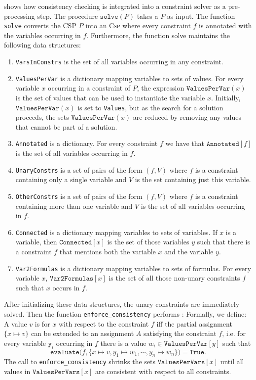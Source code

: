   shows how consistency checking is
integrated into a constraint solver as a pre-processing step.
The procedure $\texttt{solve}(P)$ takes a 
$P$ as input.  The function \texttt{solve} converts the CSP $P$ into an  \textsc{Csp} where every
constraint $f$ is annotated with the variables occurring in $f$.  Furthermore, the function solve maintains the
following data structures: 
\begin{enumerate}
\item \texttt{VarsInConstrs} is the set of all variables occurring in any constraint.
\item \texttt{ValuesPerVar} is a dictionary mapping variables to sets of values.  For every variable $x$
      occurring in a constraint of $P$, the expression $\texttt{ValuesPerVar}(x)$ is the set of values that can
      be used to instantiate the variable $x$.  Initially, $\texttt{ValuesPerVar}(x)$ is set to
      \texttt{Values}, but as the search for a solution proceeds, the sets $\texttt{ValuesPerVar}(x)$ are
      reduced by removing any values that  cannot be part of a solution. 
\item \texttt{Annotated} is a dictionary.  For every constraint $f$ we have that $\texttt{Annotated}[f]$ is the
  set of all variables occurring in $f$. 
\item \texttt{UnaryConstrs} is a set of pairs of the form $(f, V)$ where $f$ is a constraint containing only a
      single variable and $V$ is the set containing just this variable. 
\item \texttt{OtherConstrs} is a set of pairs of the form $(f, V)$ where $f$ is a constraint containing more
      than one variable and $V$ is the set of all variables occurring in $f$. 
\item \texttt{Connected} is a dictionary mapping variables to sets of variables.  If $x$ is a variable, then
      $\texttt{Connected}[x]$ is the set of those variables $y$ such that there is a constraint $f$ that
      mentions both the variable $x$ and the variable $y$. 
\item \texttt{Var2Formulas} is a dictionary mapping variables to sets of formulas.  For every variable $x$,
      $\texttt{Var2Formulas}[x]$ is the set of all those non-unary constraints $f$ such that $x$ occurs in $f$. 
\end{enumerate}
After initializing these data structures, the unary constraints are immediately solved.  Then the
function \texttt{enforce\_consistency} performs  :  
Formally, we define: A value $v$ is  for $x$ with respect to the constraint $f$
iff the partial assignment $\{ x \mapsto v \}$ can be extended to an assignment $A$ satisfying the constraint $f$,
i.e. for every variable $\texttt{y}_i$ occurring in $f$ there is a value $w_i \in \texttt{ValuesPerVar}[y]$ such that  
$$ \texttt{evaluate}\bigl(f, \{ x \mapsto v, y_1 \mapsto w_1, \cdots, y_n \mapsto w_n\}\bigr) = \texttt{True}. $$
The call to \texttt{enforce\_consistency} shrinks the sets $\texttt{ValuesPerVars}[x]$ until all values in
$\texttt{ValuesPerVars}[x]$ are consistent with respect to all constraints.


